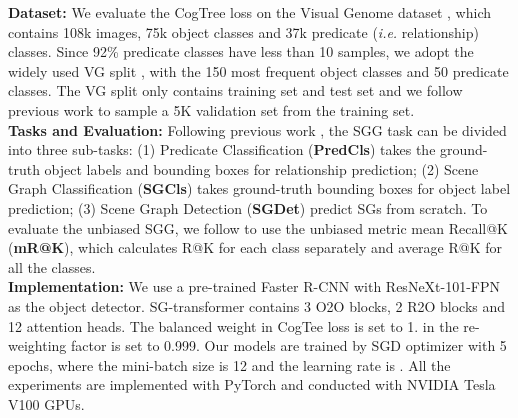 \documentclass[letterpaper]{article} \usepackage{aaai21}  \usepackage{times}  \usepackage{helvet} \usepackage{courier}  \usepackage[hyphens]{url}  \usepackage{graphicx} \urlstyle{rm} \def\UrlFont{\rm}  \usepackage{natbib}  \usepackage{caption} \frenchspacing  \setlength{\pdfpagewidth}{8.5in}  \setlength{\pdfpageheight}{11in}  \usepackage{amsmath,amsthm}
\begin{document}
\textbf{Dataset:} We evaluate the CogTree loss on the Visual Genome  dataset \cite{krishna2017visual}, which contains 108k images, 75k object classes and 37k predicate (\textit{i.e.} relationship) classes. Since 92\% predicate classes have less than 10 samples,  we adopt the widely used VG split \cite{xu2017scene,zellers2018neural,tang2019learning,chen2019counterfactual,Tang2020Unbiased}, with the 150 most frequent object classes and 50 predicate classes. The VG split only contains training set and test set and we follow previous work \cite{zellers2018neural} to sample a 5K validation set from the training set.
\\
\textbf{Tasks and Evaluation:} Following previous work \cite{zellers2018neural}, the SGG task can be divided into three sub-tasks: (1) Predicate Classification (\textbf{PredCls}) takes the ground-truth object labels and bounding boxes for relationship prediction; (2) Scene Graph Classification (\textbf{SGCls}) takes ground-truth bounding boxes for object label prediction; (3) Scene Graph Detection (\textbf{SGDet}) predict SGs from scratch. 
To evaluate the unbiased SGG, we follow \cite{chen2019knowledge,tang2019learning} to use the unbiased metric mean Recall@K (\textbf{mR@K}), which calculates R@K for each class separately and average R@K for all the classes.
\\
\textbf{Implementation:} We use a pre-trained Faster R-CNN \cite{ren2015faster} with ResNeXt-101-FPN \cite{Lin2017Feature} as the object detector. SG-transformer contains 3 O2O blocks, 2 R2O blocks and 12 attention heads. The balanced weight  in CogTee loss is set to 1.  in the re-weighting factor is set to 0.999. Our models are trained by SGD optimizer with 5 epochs, where the mini-batch size is 12 and the learning rate is .  All the experiments are implemented with PyTorch and conducted with NVIDIA Tesla V100 GPUs.   
\end{document}
